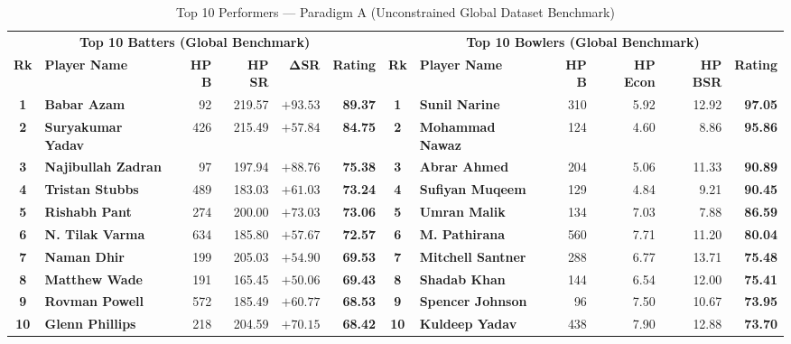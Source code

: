 \documentclass[11pt,a4paper]{article}
\begin{document}
\begin{table}[t]
\centering
\small
\caption{Top 10 Performers --- Paradigm A (Unconstrained Global Dataset Benchmark)}
\label{tab:top10_global}
\begin{tabularx}{\textwidth}{c l r r r r | c l r r r r}
\toprule
\multicolumn{6}{c|}{\textbf{Top 10 Batters (Global Benchmark)}} & \multicolumn{6}{c}{\textbf{Top 10 Bowlers (Global Benchmark)}} \\
\textbf{Rk} & \textbf{Player Name} & \textbf{HP B} & \textbf{HP SR} & $\mathbf{\Delta}$\textbf{SR} & \textbf{Rating} & \textbf{Rk} & \textbf{Player Name} & \textbf{HP B} & \textbf{HP Econ} & \textbf{HP BSR} & \textbf{Rating} \\
\midrule
\textbf{1} & \textbf{Babar Azam} & 92 & 219.57 & $+93.53$ & \textbf{89.37} & \textbf{1} & \textbf{Sunil Narine} & 310 & 5.92 & 12.92 & \textbf{97.05} \\
\textbf{2} & \textbf{Suryakumar Yadav} & 426 & 215.49 & $+57.84$ & \textbf{84.75} & \textbf{2} & \textbf{Mohammad Nawaz} & 124 & 4.60 & 8.86 & \textbf{95.86} \\
\textbf{3} & \textbf{Najibullah Zadran} & 97 & 197.94 & $+88.76$ & \textbf{75.38} & \textbf{3} & \textbf{Abrar Ahmed} & 204 & 5.06 & 11.33 & \textbf{90.89} \\
\textbf{4} & \textbf{Tristan Stubbs} & 489 & 183.03 & $+61.03$ & \textbf{73.24} & \textbf{4} & \textbf{Sufiyan Muqeem} & 129 & 4.84 & 9.21 & \textbf{90.45} \\
\textbf{5} & \textbf{Rishabh Pant} & 274 & 200.00 & $+73.03$ & \textbf{73.06} & \textbf{5} & \textbf{Umran Malik} & 134 & 7.03 & 7.88 & \textbf{86.59} \\
\textbf{6} & \textbf{N. Tilak Varma} & 634 & 185.80 & $+57.67$ & \textbf{72.57} & \textbf{6} & \textbf{M. Pathirana} & 560 & 7.71 & 11.20 & \textbf{80.04} \\
\textbf{7} & \textbf{Naman Dhir} & 199 & 205.03 & $+54.90$ & \textbf{69.53} & \textbf{7} & \textbf{Mitchell Santner} & 288 & 6.77 & 13.71 & \textbf{75.48} \\
\textbf{8} & \textbf{Matthew Wade} & 191 & 165.45 & $+50.06$ & \textbf{69.43} & \textbf{8} & \textbf{Shadab Khan} & 144 & 6.54 & 12.00 & \textbf{75.41} \\
\textbf{9} & \textbf{Rovman Powell} & 572 & 185.49 & $+60.77$ & \textbf{68.53} & \textbf{9} & \textbf{Spencer Johnson} & 96 & 7.50 & 10.67 & \textbf{73.95} \\
\textbf{10} & \textbf{Glenn Phillips} & 218 & 204.59 & $+70.15$ & \textbf{68.42} & \textbf{10} & \textbf{Kuldeep Yadav} & 438 & 7.90 & 12.88 & \textbf{73.70} \\
\bottomrule
\end{tabularx}
\end{table}
\end{document}
